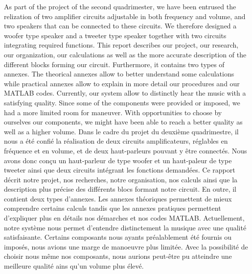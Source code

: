 \biabstract
{
    As part of the project of the second quadrimester, we have been entrused the relization of two amplifier circuits adjustable in both frequency and volume, and two speakers that can be connected to these circuits. We therefore designed a woofer type speaker and a tweeter type speaker together with two circuits integrating required functions. This report describes our project, our research, our organization, our calculations as well as the more accurate description of the different blocks forming our circuit. Furthermore, it contains two types of annexes. The theorical annexes allow to better understand some calculations while practical annexes allow to explain in more detail our procedures and our MATLAB codes. Currently, our system allow to distinctly hear the music with a satisfying quality. Since some of the components were provided or imposed, we had a more limited room for maneuver. With opportunities to choose by ourselves our components, we might have been able to reach a better quality as well as a higher volume.
}
{
    Dans le cadre du projet du deuxième quadrimestre, il nous a été confié la réalisation de deux circuits amplificateurs, réglables en fréquence et en volume, et de deux haut-parleurs pouvant y être connectés. Nous avons donc conçu un haut-parleur de type woofer et un haut-paleur de type tweeter ainsi que deux circuits intégrant les fonctions demandées.
Ce rapport décrit notre projet, nos recherches, notre organisation, nos calculs ainsi que la description plus précise des différents blocs formant notre circuit. En outre, il contient deux types d'annexes. Les annexes théoriques permettent de mieux comprendre certains calculs tandis que les annexes pratiques permettent d'expliquer plus en détails nos démarches et nos codes MATLAB.
Actuellement, notre système nous permet d'entendre distinctement la musique avec une qualité satisfaisante. Certains composants nous ayants préalablement été fournis ou imposés, nous avions une marge de manoeuvre plus limitée.
Avec la possibilité de choisir nous même nos composants, nous aurions peut-être pu atteindre une meilleure qualité ains qu'un volume plus élevé.
}
